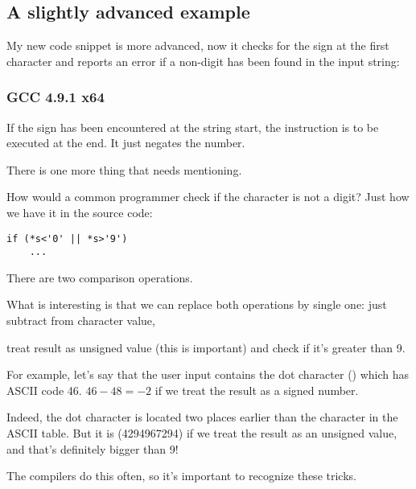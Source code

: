 \subsection{A slightly advanced example}

My new code snippet is more advanced, now it checks for the  sign at the first character
and reports an error if a non-digit has been found in the input string:



\subsubsection{\Optimizing GCC 4.9.1 x64}




If the  sign has been encountered at the string start, the  instruction is to be executed at the end.
It just negates the number.

\label{one_comparison_instead_of_two}
There is one more thing that needs mentioning.

How would a common programmer check if the character is not a digit?
Just how we have it in the source code:

\begin{lstlisting}
if (*s<'0' || *s>'9')
    ...
\end{lstlisting}

There are two comparison operations.

What is interesting is that we can replace both operations by single one:
just subtract  from character value,

treat result as unsigned value (this is important) and check if it's greater than 9.

For example, let's say that the user input contains the dot character () which has \ac{ASCII} code 46.
$46-48=-2$ if we treat the result as a signed number.

Indeed, the dot character is located two places earlier than the  character in the \ac{ASCII} table.
But it is  (4294967294) 
if we treat the result as an unsigned value, and that's definitely bigger than 9!

The compilers do this often, so it's important to recognize these tricks.

